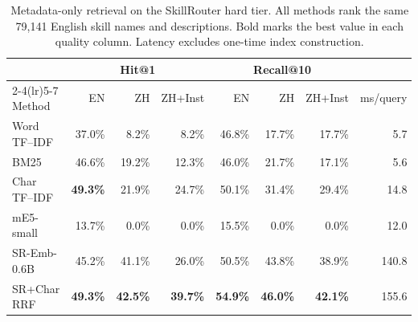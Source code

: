 \begin{table}[t]
\centering
\small
\setlength{\tabcolsep}{4.2pt}
\begin{tabular}{lrrrrrrr}
\toprule
& \multicolumn{3}{c}{Hit@1} & \multicolumn{3}{c}{Recall@10} & \\
\cmidrule(lr){2-4}\cmidrule(lr){5-7}
Method & EN & ZH & ZH+Inst & EN & ZH & ZH+Inst & ms/query \\
\midrule
Word TF--IDF & 37.0\% & 8.2\% & 8.2\% & 46.8\% & 17.7\% & 17.7\% & 5.7 \\
BM25 & 46.6\% & 19.2\% & 12.3\% & 46.0\% & 21.7\% & 17.1\% & 5.6 \\
Char TF--IDF & \textbf{49.3\%} & 21.9\% & 24.7\% & 50.1\% & 31.4\% & 29.4\% & 14.8 \\
mE5-small & 13.7\% & 0.0\% & 0.0\% & 15.5\% & 0.0\% & 0.0\% & 12.0 \\
SR-Emb-0.6B & 45.2\% & 41.1\% & 26.0\% & 50.5\% & 43.8\% & 38.9\% & 140.8 \\
SR+Char RRF & \textbf{49.3\%} & \textbf{42.5\%} & \textbf{39.7\%} & \textbf{54.9\%} & \textbf{46.0\%} & \textbf{42.1\%} & 155.6 \\
\bottomrule
\end{tabular}
\caption{Metadata-only retrieval on the SkillRouter hard tier.  All methods
rank the same 79,141 English skill names and descriptions.  Bold marks the best
value in each quality column.  Latency excludes one-time index construction.}
\label{tab:public}
\end{table}
